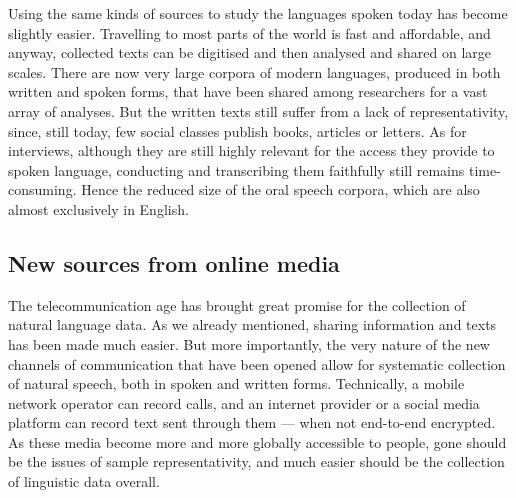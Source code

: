 \documentclass[../thesis.tex]{subfiles}
\begin{document}
Using the same kinds of sources to study the languages spoken today has become slightly
easier. Travelling to most parts of the world is fast and affordable, and anyway,
collected texts can be digitised and then analysed and shared on large scales. There are
now very large corpora of modern languages, produced in both written
\cite{GrieveCorpusbasedRegional2009,GrieveRegionalVariation2016,BiberCorpusBasedInvestigations1996,McEnerySwearingModern2004}
and spoken
\cite{McEnerySwearingModern2004,SchweinbergerSwearingIrish2018,StenstromTrendsTeenage2002,LabovSocialStratification1966}
forms, that have been shared among researchers for a vast array of analyses. But the
written texts still suffer from a lack of representativity, since, still today, few
social classes publish books, articles or letters. As for interviews, although they are
still highly relevant for the access they provide to spoken language, conducting and
transcribing them faithfully still remains time-consuming. Hence the reduced size of the
oral speech corpora, which are also almost exclusively in English.


\subsection{New sources from online media}
\label{sec:methods_online_data}
The telecommunication age has brought great promise for the collection of natural
language data. As we already mentioned, sharing information and texts has been made much
easier. But more importantly, the very nature of the new channels of
communication that have been opened allow for systematic collection of natural speech,
both in spoken and written forms. Technically, a mobile network operator can record
calls, and an internet provider or a social media platform can record text sent through them
--- when not end-to-end encrypted. As these media become more and more globally
accessible to people, gone should be the issues of sample representativity, and much
easier should be the collection of linguistic data overall.
\end{document}
